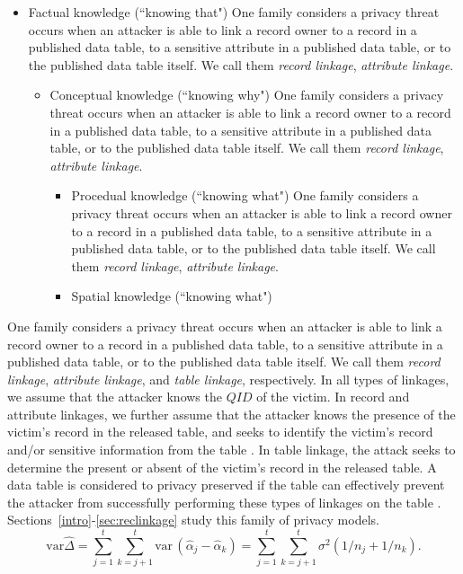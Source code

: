\begin{itemize}
\item Factual knowledge (``knowing that") One family considers a privacy
threat occurs when an attacker is able to link a record owner to a record
in a published data table, to a sensitive attribute in a published data
table, or to the published data table itself. We call them \emph{record
linkage}, \emph{attribute linkage}.
\begin{itemize}
\item Conceptual knowledge (``knowing why") One family considers a privacy
threat occurs when an attacker is able to link a record owner to a record
in a published data table, to a sensitive attribute in a published data
table, or to the published data table itself. We call them \emph{record
linkage}, \emph{attribute linkage}.
\begin{itemize}
\item Procedual knowledge (``knowing what") One family considers a privacy
threat occurs when an attacker is able to link a record owner to a record
in a published data table, to a sensitive attribute in a published data
table, or to the published data table itself. We call them \emph{record
linkage}, \emph{attribute linkage}.
\item Spatial knowledge (``knowing what")
\end{itemize}
\end{itemize}
\end{itemize}


One family considers a privacy threat occurs when an attacker is able to link a record owner to a record in a published data table, to a sensitive attribute in a published data table, or to the published data table itself. We call them \emph{record linkage}, \emph{attribute linkage}, and \emph{table linkage}, respectively. In all types of linkages, we assume that the attacker knows the $QID$ of the victim. In record and attribute linkages, we further assume that the attacker knows the presence of the victim's record in the released table, and seeks to identify the victim's record and/or sensitive information from the table \cite{yao2002can}. In table linkage, the attack seeks to determine the present or absent of the victim's record in the released table. A data table is considered to privacy preserved if the table can effectively prevent the attacker from successfully performing these types of linkages on the table \cite{madden2002tta}. Sections~\ref{intro}-\ref{sec:reclinkage} study this family of privacy models.
\begin{equation}
\mbox{var}\widehat{\Delta} = \sum_{j = 1}^t \sum_{k = j+1}^t
\mbox{var}\,(\hat{\alpha}_j - \hat{\alpha}_k)  = \sum_{j = 1}^t
\sum_{k = j+1}^t \sigma^2(1/n_j + 1/n_k). \label{2delvart2}
\end{equation}


